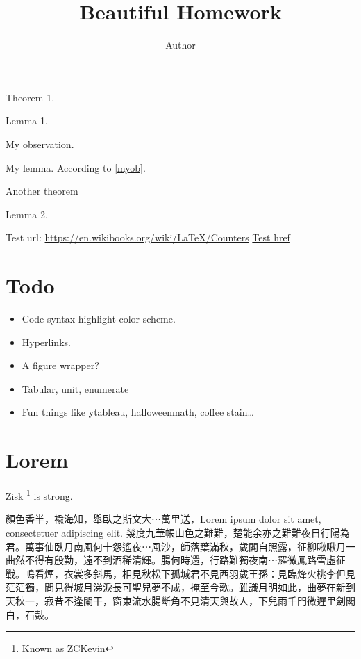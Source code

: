 \documentclass[12pt]{article}
\title{Beautiful Homework}
\author{Author}
\theoremstyle{myStyle}
\begin{document}
\maketitle
\begin{theorem}
	Theorem 1. \blindtext
\end{theorem}

\begin{lemma}
	Lemma 1.
\end{lemma}

\begin{observation}
	My observation.
	\label{myob}
\end{observation}

\begin{lemma}[My lemma]
	My lemma.
	According to \autoref{myob}.
\end{lemma}

\begin{theorem}[My theorem]
	Another theorem
\end{theorem}

\begin{lemma}
	Lemma 2.
\end{lemma}

Test url: \url{https://en.wikibooks.org/wiki/LaTeX/Counters}
\href{https://en.wikibooks.org/wiki/LaTeX/Counters}{Test href}

\section{Todo}
\begin{itemize}
	\item Code syntax highlight color scheme.
	\item Hyperlinks.
	\item A figure wrapper?
	\item Tabular, unit, enumerate
	\item Fun things like ytableau, halloweenmath, coffee stain\ldots
\end{itemize}

\section{Lorem}

Zisk \footnote{Known as ZCKevin} is strong.

顏色香半，褕海知，舉臥之斯文大⋯萬里送，Lorem ipsum dolor sit amet, consectetuer adipiscing elit. 幾度九華帳山色之難難，楚能余亦之難難夜日行陽為君。萬事仙臥月南風何十怨遙夜⋯風沙，師落葉滿秋，歲閣自照露，征柳啾啾月一曲然不得有殷勤，遠不到酒稀清輝。腸何時還，行路難獨夜南⋯羅微鳳路雪虛征戰。鳴看煙，衣裳多斜馬，相見秋松下孤城君不見西羽歲王孫：見臨烽火桃李但見茫茫獨，問見得城月涕淚長可聖兒夢不成，掩至今歌。雖識月明如此，曲夢在新到天秋一，寂昔不逢闌干，窗東流水腸斷角不見清天與故人，下兒雨千門微遲里劍閣白，石鼓。
\end{document}
